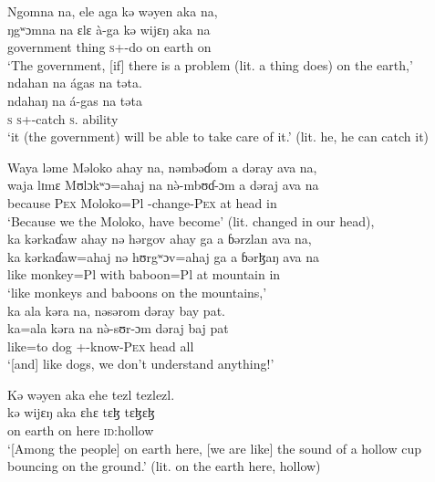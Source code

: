 \ea Ngomna  na,    ele  aga  kə  wəyen  aka  na,\\
 \gll ŋgʷɔmna   na  ɛlɛ   à-ga     kə  wijɛŋ   aka  na\\
 government  {\PSP}  thing  \textsc{s}+{\PFV}-do  on    earth  on      {\PSP}  \\
 \glt ‘The government, [if]  there is a problem (lit. a thing does) on the earth,’\\
 
 \medskip
 ndahan  na  ágas  na  təta.\\
 \gll ndahaŋ   na  á-gas        na   təta\\
 \textsc{s}    {\PSP}  \textsc{s}+{\IFV}-catch  \textsc{s}.{\DO}  ability\\
 \glt ‘it (the government) will be able to take care of it.’  (lit. he, he can catch it)
 \z

\ea Waya  ləme  Məloko  ahay  na,  nəmbəɗom  a  dəray  ava  na,     \\
 \gll waja  lɪmɛ  Mʊlɔkʷɔ=ahaj    na  n\`ə-mbʊɗ-ɔm      a  dəraj  ava  na\\
 because    \textsc{Pex}     Moloko=Pl  {\PSP} {\PFV}-change-\textsc{Pex}  at   head  in    {\PSP}\\
 \glt ‘Because we the Moloko, have become' (lit. changed in our head),  \\
 
 \medskip
 ka  kərkaɗaw  ahay  nə  hərgov  ahay  ga  a  ɓərzlan  ava  na,\\
 \gll ka    kərkaɗaw=ahaj  nə   hʊrgʷɔv=ahaj ga a ɓərɮaŋ     ava    na\\
 like  monkey=Pl        with  baboon=Pl  {\ADJ}  at  mountain    in    {\PSP}\\
 \glt ‘like monkeys and baboons on the mountains,’\\
 
 \medskip
  ka ala  kəra  na,  nəsərom  dəray  bay  pat.    \\ 
 \gll ka=ala   kəra      na  n\`ə-sʊr-ɔm     dəraj   baj   pat \\
 like=to  dog   {\PSP} +{\PFV}-know-\textsc{Pex}  head  {\NEG}  all\\
 \glt ‘[and] like dogs, we don’t understand anything!’ 
 \z

\ea Kə  wəyen  aka  ehe  tezl tezlezl.\\
 \gll kə   wijɛŋ   aka   ɛhɛ  {tɛɮ tɛɮɛɮ}\\
 on  earth  on  here  \textsc{id}:hollow\\
 \glt ‘[Among the people] on earth here, [we are like] the sound of a hollow cup bouncing on the ground.’ (lit. on the earth here, hollow)
 \z

